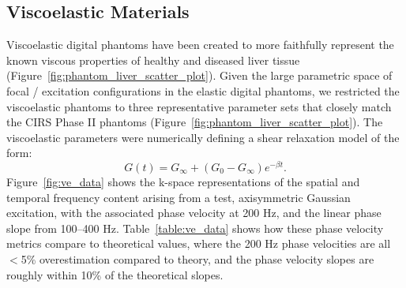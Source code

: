\subsection{Viscoelastic Materials}
Viscoelastic digital phantoms have been created to more faithfully represent
the known viscous properties of healthy and diseased liver tissue
(Figure~\ref{fig:phantom_liver_scatter_plot}).  Given the large parametric
space of focal / excitation configurations in the elastic digital phantoms, we
restricted the viscoelastic phantoms to three representative parameter sets
that closely match the CIRS Phase II phantoms
(Figure~\ref{fig:phantom_liver_scatter_plot}).  The viscoelastic parameters
were numerically defining a shear relaxation model of the form:
\begin{equation}
    G(t) = G_\infty + (G_0 - G_\infty)e^{-\beta t}.
\label{eqn:shear_relaxation}
\end{equation}
Figure~\ref{fig:ve_data} shows the k-space representations of the spatial and
temporal frequency content arising from a test, axisymmetric Gaussian
excitation, with the associated phase velocity at 200 Hz, and the linear phase
slope from 100--400 Hz.  Table~\ref{table:ve_data} shows how these phase
velocity metrics compare to theoretical values, where the 200 Hz phase
velocities are all $<$5\% overestimation compared to theory, and the phase
velocity slopes are roughly within 10\% of the theoretical slopes.

